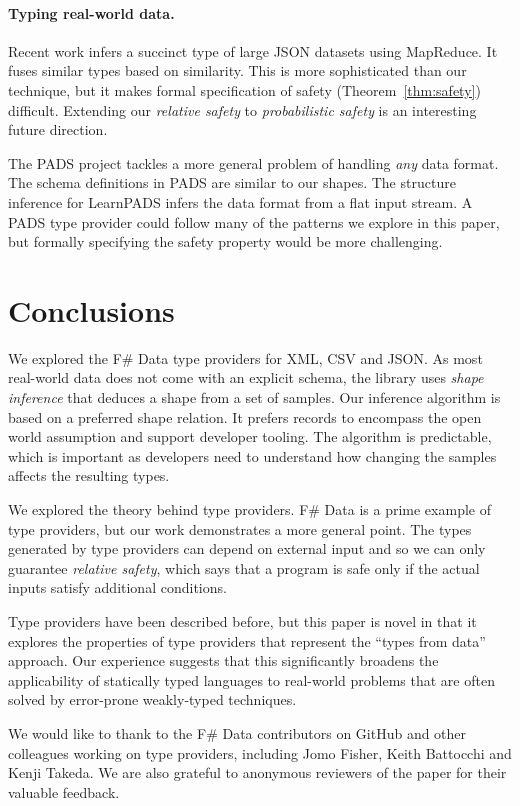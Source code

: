 \documentclass[10pt]{sigplanconf}
\begin{document}
\paragraph{Typing real-world data.}
Recent work \cite{typing-json} infers a succinct type of large JSON datasets using MapReduce.
It fuses similar types based on similarity. This is more sophisticated than our technique, but it 
makes formal specification of safety (Theorem~\ref{thm:safety}) difficult. Extending our 
\emph{relative safety} to \emph{probabilistic safety} is an interesting future direction.

The PADS project \cite{pads-dsl,pads-ml} tackles a more general problem of handling \emph{any} data format.
The schema definitions in PADS are similar to our shapes. The structure inference for LearnPADS
\cite{pads-learn} infers the data format from a flat input stream. A PADS type provider could follow
many of the patterns we explore in this paper, but formally specifying the safety property would be
more challenging.

\section{Conclusions}
\label{sec:conclusions}

We explored the F\# Data type providers for XML, CSV and JSON. As most real-world data does not come 
with an explicit schema, the library uses \emph{shape inference} that deduces a shape from a set of 
samples. Our inference algorithm is based on a preferred shape relation. It prefers records to 
encompass the open world assumption and support developer tooling. The algorithm is predictable, which is 
important as developers need to understand how changing the samples affects the resulting types.

We explored the theory behind type providers. F\# Data is a prime example of 
type providers, but our work demonstrates a more general point. The types generated by type 
providers can depend on external input and so we can only guarantee \emph{relative safety}, 
which says that a program is safe only if the actual inputs satisfy additional conditions.

Type providers have been described before, but this paper is novel in that it explores the 
properties of type providers that represent the ``types from data'' approach. Our experience suggests 
that this significantly broadens the applicability of statically typed languages to real-world 
problems that are often solved by error-prone weakly-typed techniques.

\acks
We would like to thank to the F\# Data contributors on GitHub and other colleagues working 
on type providers, including Jomo Fisher, Keith Battocchi and Kenji Takeda. We are also
grateful to anonymous reviewers of the paper for their valuable feedback.



\end{document}
